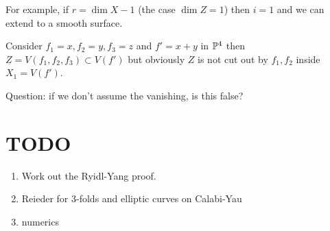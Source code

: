 \documentclass[12pt]{article}
\begin{document}
For example, if $r = \dim{X} - 1$ (the case $\dim{Z} = 1$) then $i = 1$ and we can extend to a smooth surface.


\begin{rmk}
Consider $f_1 = x, f_2 = y, f_3 = z$ and $f' = x+y$ in $\P^4$ then $Z = V(f_1, f_2, f_3) \subset V(f')$ but obviously $Z$ is not cut out by $f_1, f_2$ inside $X_1 = V(f')$.
\end{rmk}

Question: if we don't assume the vanishing, is this false?


\section{TODO}

\begin{enumerate}
\item Work out the Ryidl-Yang proof.
\item Reieder for 3-folds and elliptic curves on Calabi-Yau
\item numerics 
\end{enumerate}
\end{document}
